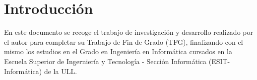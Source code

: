 %
%
%
%
\chapter*{Introducción}

En este documento se recoge el trabajo de investigación y desarrollo realizado por el 
autor para completar su Trabajo de Fin de Grado (TFG), finalizando con el mismo
los estudios en el Grado en Ingeniería en Informática cursados en la Escuela Superior 
de Ingerniería y Tecnología - Sección Informática (ESIT-Informática) de la ULL.

